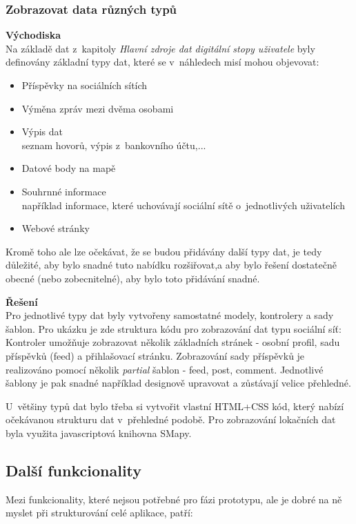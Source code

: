 \subsubsection*{Zobrazovat data různých typů}
	\textbf{Východiska}\\
	Na základě dat z~kapitoly \textit{Hlavní zdroje dat digitální stopy uživatele} byly definovány základní typy dat, které se v~náhledech misí mohou objevovat:

	\begin{itemize}
		\item Příspěvky na sociálních sítích
		\item Výměna zpráv mezi dvěma osobami
		\item Výpis dat\\
			seznam hovorů, výpis z~bankovního účtu,...
		\item Datové body na mapě
		\item Souhrnné informace\\
			například informace, které uchovávají sociální sítě o~jednotlivých uživatelích
		\item Webové stránky
	\end{itemize}

	Kromě toho ale lze očekávat, že se budou přidávány další typy dat, je tedy důležité, aby bylo snadné tuto nabídku rozšiřovat,a aby bylo řešení dostatečně obecné (nebo zobecnitelné), aby bylo toto přidávání snadné. 

	\textbf{Řešení}\\
	Pro jednotlivé typy dat byly vytvořeny samostatné modely, kontrolery a sady šablon. Pro ukázku je zde struktura kódu pro zobrazování dat typu sociální síť:\\
	Kontroler umožňuje zobrazovat několik základních stránek - osobní profil, sadu příspěvků (feed) a přihlašovací stránku.
	Zobrazování sady příspěvků je realizováno pomocí několik \textit{partial} šablon - feed, post, comment. Jednotlivé šablony je pak snadné například designově upravovat a zůstávají velice přehledné.

	U~většiny typů dat bylo třeba si vytvořit vlastní HTML+CSS kód, který nabízí očekávanou strukturu dat v~přehledné podobě.
	Pro zobrazování lokačních dat byla využita javascriptová knihovna SMapy.   


\subsection{Další funkcionality}
Mezi funkcionality, které nejsou potřebné pro fázi prototypu, ale je dobré na ně myslet při strukturování celé aplikace, patří:

